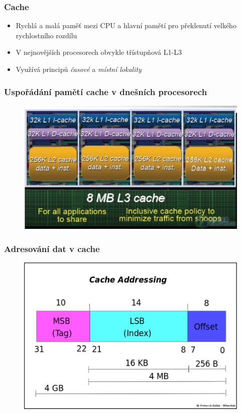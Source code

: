 \documentclass[professionalfonts,svgnames]{beamer}
\begin{document}
 \begin{frame}
\frametitle{Cache}
\begin{itemize}
\item Rychlá a malá paměť mezi CPU a hlavní pamětí pro překlenutí velkého rychlostního rozdílu
\item V nejnovějších procesorech obvykle třístupňová L1-L3
\item Využívá principů \textit{časové} a \textit{místní lokality}
\end{itemize}
\end{frame}

 \begin{frame}
\frametitle{Uspořádání pamětí cache v dnešních procesorech}
\begin{figure}[h]
	\includegraphics[scale=0.55]{fig/cache}
\end{figure}
\end{frame}

 \begin{frame}
\frametitle{Adresování dat v cache}
\begin{figure}[h]
	\includegraphics[width=\textwidth,keepaspectratio]{fig/addr}
\end{figure}
\end{frame}
\end{document}
